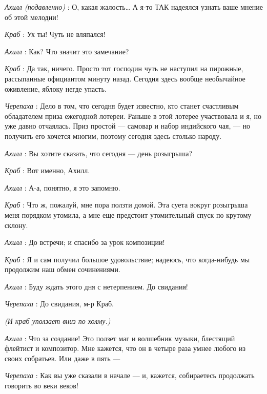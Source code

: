 \documentclass[../main.tex]{subfiles}
\begin{document}
\begin{dialogue}
\emph{Ахилл (подавленно)} : О, какая жалость\ldots{} А я-то ТАК надеялся узнать ваше мнение об этой мелодии!

\emph{Краб} : Ух ты! Чуть не вляпался!

\emph{Ахилл} : Как? Что значит это замечание?

\emph{Краб} : Да так, ничего. Просто тот господин чуть не наступил на пирожные, рассыпанные официантом минуту назад. Сегодня здесь вообще необычайное оживление, яблоку негде упасть.

\emph{Черепаха} : Дело в том, что сегодня будет известно, кто станет счастливым обладателем приза ежегодной лотереи. Раньше в этой лотерее участвовала и я, но уже давно отчаялась. Приз простой --- самовар и набор индийского чая, --- но получить его хочется многим, поэтому сегодня здесь столько народу.

\emph{Ахилл} : Вы хотите сказать, что сегодня --- день розыгрыша?

\emph{Краб} : Вот именно, Ахилл.

\emph{Ахилл} : А-а, понятно, я это запомню.

\emph{Краб} : Что ж, пожалуй, мне пора ползти домой. Эта суета вокруг розыгрыша меня порядком утомила, а мне еще предстоит утомительный спуск по крутому склону.

\emph{Ахилл} : До встречи; и спасибо за урок композиции!

\emph{Краб} : Я и сам получил большое удовольствие; надеюсь, что когда-нибудь мы продолжим наш обмен сочинениями.

\emph{Ахилл} : Буду ждать этого дня с нетерпением. До свидания!

\emph{Черепаха} : До свидания, м-р Краб.

\emph{(И краб уползает вниз по холму.)}

\emph{Ахилл} : Что за создание! Это ползет маг и волшебник музыки, блестящий флейтист и композитор. Мне кажется, что он в четыре раза умнее любого из своих собратьев. Или даже в пять ---

\emph{Черепаха} : Как вы уже сказали в начале --- и, кажется, собираетесь продолжать говорить во веки веков!

\end{dialogue}
\end{document}
